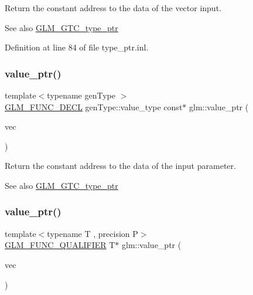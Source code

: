 Return the constant address to the data of the vector input. \begin{DoxySeeAlso}{See also}
\hyperlink{group__gtc__type__ptr}{G\+L\+M\+\_\+\+G\+T\+C\+\_\+type\+\_\+ptr} 
\end{DoxySeeAlso}


Definition at line 84 of file type\+\_\+ptr.\+inl.

\mbox{\label{group__gtc__type__ptr_gaf019636bb8bd7c9efb7c7ce3bb23bcfc}} 
\subsubsection{\texorpdfstring{value\+\_\+ptr()}{value\_ptr()}\hspace{0.1cm}{\footnotesize\ttfamily [6/27]}}
{\footnotesize\ttfamily template$<$typename gen\+Type $>$ \\
\hyperlink{setup_8hpp_ab2d052de21a70539923e9bcbf6e83a51}{G\+L\+M\+\_\+\+F\+U\+N\+C\+\_\+\+D\+E\+CL} gen\+Type\+::value\+\_\+type const$\ast$ glm\+::value\+\_\+ptr (\begin{DoxyParamCaption}\item[{gen\+Type const \&}]{vec }\end{DoxyParamCaption})}

Return the constant address to the data of the input parameter. \begin{DoxySeeAlso}{See also}
\hyperlink{group__gtc__type__ptr}{G\+L\+M\+\_\+\+G\+T\+C\+\_\+type\+\_\+ptr} 
\end{DoxySeeAlso}
\mbox{\label{group__gtc__type__ptr_gaa3ed69a05293987972b589311e5feb23}} 
\subsubsection{\texorpdfstring{value\+\_\+ptr()}{value\_ptr()}\hspace{0.1cm}{\footnotesize\ttfamily [7/27]}}
{\footnotesize\ttfamily template$<$typename T , precision P$>$ \\
\hyperlink{setup_8hpp_a33fdea6f91c5f834105f7415e2a64407}{G\+L\+M\+\_\+\+F\+U\+N\+C\+\_\+\+Q\+U\+A\+L\+I\+F\+I\+ER} T$\ast$ glm\+::value\+\_\+ptr (\begin{DoxyParamCaption}\item[{\hyperlink{structglm_1_1detail_1_1tvec4}{detail\+::tvec4}$<$ T, P $>$ \&}]{vec }\end{DoxyParamCaption})}

